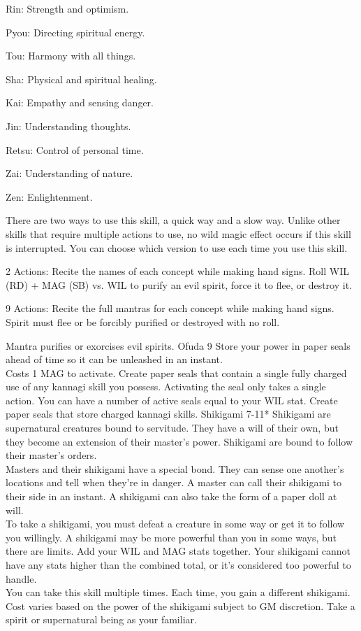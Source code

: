 \begin{path}
{\begin{wldescription}
\item [Rin:]  Strength and optimism.
\item [Pyou:]  Directing spiritual energy.
\item [Tou:]  Harmony with all things.
\item [Sha:]  Physical and spiritual healing.
\item [Kai:]  Empathy and sensing danger.
\item [Jin:]  Understanding thoughts.
\item [Retsu:]  Control of personal time.
\item [Zai:]  Understanding of nature.
\item [Zen:]  Enlightenment.
\end{wldescription}
There are two ways to use this skill, a quick way and a slow way. Unlike other skills that require multiple actions to use, no wild magic effect occurs if this skill is interrupted. You can choose which version to use each time you use this skill.
\begin{wldescription}
\item [2 Actions:]  Recite the names of each concept while making hand signs. Roll WIL (RD) + MAG (SB) vs. WIL to purify an evil spirit, force it to flee, or destroy it.
\item [9 Actions:]  Recite the full mantras for each concept while making hand signs. Spirit must flee or be forcibly purified or destroyed with no roll.
\end{wldescription}
}
{Mantra purifies or exorcises evil spirits.}
\skilldescription
{Ofuda}
{9}
{Store your power in paper seals ahead of time so it can be unleashed in an instant.
\\Costs 1 MAG to activate. Create paper seals that contain a single fully charged use of any kannagi skill you possess. Activating the seal only takes a single action. You can have a number of active seals equal to your WIL stat.}
{Create paper seals that store charged kannagi skills.}
\skilldescription
{Shikigami}
{7-11*}
{Shikigami are supernatural creatures bound to servitude. They have a will of their own, but they become an extension of their master's power. Shikigami are bound to follow their master's orders.
\\Masters and their shikigami have a special bond. They can sense one another's locations and tell when they're in danger. A master can call their shikigami to their side in an instant. A shikigami can also take the form of a paper doll at will.
\\To take a shikigami, you must defeat a creature in some way or get it to follow you willingly. A shikigami may be more powerful than you in some ways, but there are limits. Add your WIL and MAG stats together. Your shikigami cannot have any stats higher than the combined total, or it's considered too powerful to handle.
\\You can take this skill multiple times. Each time, you gain a different shikigami. Cost varies based on the power of the shikigami subject to GM discretion.}
{Take a spirit or supernatural being as your familiar.}

\end{path}
